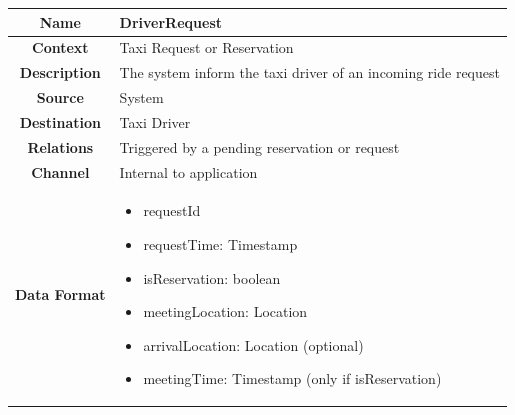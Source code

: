 \documentclass[11pt, a4paper,titlepage]{article}
\begin{document}
				\begin{tabularx}{\textwidth}{| c | X |}
					\hline
					\textbf{Name} & 
					DriverRequest
					\\
					\hline
					\textbf{Context} & 
					Taxi Request or Reservation
					\\
					\hline
					\textbf{Description} & 
					The system inform the taxi driver of an incoming ride request
					\\
					\hline
					\textbf{Source} &
					System
					\\
					\hline
					\textbf{Destination} & 
					Taxi Driver
					\\
					\hline
					\textbf{Relations} & 
					Triggered by a pending reservation or request
					\\
					\hline
					\textbf{Channel} & 
					Internal to application
					\\
					\hline
					\textbf{Data Format} & 
					\begin{itemize}
						\item requestId
						\item requestTime: Timestamp
						\item isReservation: boolean
						\item meetingLocation: Location
						\item arrivalLocation: Location (optional)
						\item meetingTime: Timestamp (only if isReservation)
					\end{itemize}
					\\
					\hline		
				\end{tabularx}
				
\end{document}
